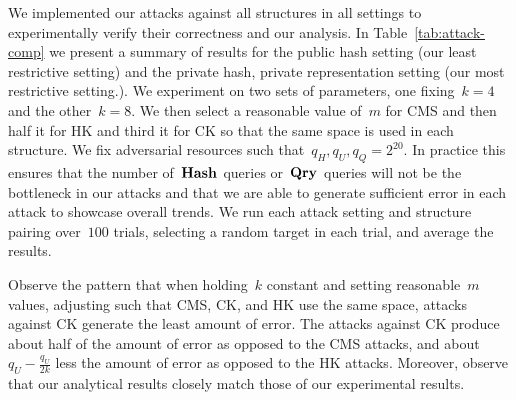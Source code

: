 We implemented our attacks against all structures in all settings to experimentally verify their correctness and our analysis. In Table~\ref{tab:attack-comp} we present a summary of results for the public hash setting (our least restrictive setting) and the private hash, private representation setting (our most restrictive setting.). We experiment on two sets of parameters, one fixing~$k=4$ and the other~$k=8$. We then select a reasonable value of~$m$ for CMS and then half it for HK and third it for CK so that the same space is used in each structure. We fix adversarial resources such that~$q_H,q_U,q_Q = 2^{20}$. In practice this ensures that the number of~$\textup{\textbf{Hash}}\hspace{0.5pt}$ queries or~$\textup{\textbf{Qry}}\hspace{0.5pt}$ queries will not be the bottleneck in our attacks and that we are able to generate sufficient error in each attack to showcase overall trends. We run each attack setting and structure pairing over~$100$ trials, selecting a random target in each trial, and average the results. 

Observe the pattern that when holding~$k$ constant and setting reasonable~$m$ values, adjusting such that CMS, CK, and HK use the same space, attacks against CK generate the least amount of error. The attacks against CK produce about half of the amount of error as opposed to the CMS attacks, and about~$q_U - \frac{q_U}{2k}$ less the amount of error as opposed to the HK attacks. Moreover, observe that our analytical results closely match those of our experimental results. 